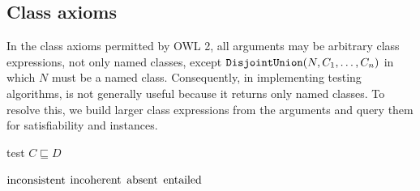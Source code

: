 \documentclass[paper.tex]{subfiles}
\begin{document}
\subsection{Class axioms}
\label{sec:algorithms:class}

In the class axioms permitted by OWL 2, all arguments may be arbitrary class expressions, not only named classes, except $\mathtt{DisjointUnion}(N, C_1, \ldots, C_n)$ in which $N$ must be a named class.  Consequently, in implementing testing algorithms,  is not generally useful because it returns only named classes.  To resolve this, we build larger class expressions from the arguments and query them for satisfiability and instances.

\begin{algorithm}[H]
  \caption{test $C \sqsubseteq D$}
  \begin{algorithmic}[1]
    \raggedright
        \State \Return $\mathrm{inconsistent}$
        \label{alg:testSubClassOf:returnInconsistent}
        \State \Return $\mathrm{incoherent}$
        \label{alg:testSubClassOf:returnIncoherent}
        \State \Return $\mathrm{absent}$
      \Else
        \State \Return $\mathrm{entailed}$
        \label{alg:testSubClassOf:returnEntailed}
      \EndIf
    \EndFunction
  \end{algorithmic}
\end{algorithm}
\end{document}
